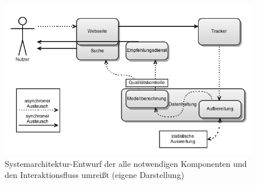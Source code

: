 \begin{itemize}
\begin{figure}[H]
  \centering
    \includegraphics[width=\textwidth]{Abbildungen/Systemmodell.png}
    \caption[Systenarchitektur]{\footnotesize Systemarchitektur-Entwurf der alle notwendigen Komponenten und den Interaktionsfluss umreißt (eigene Darstellung)}
    \label{fig:system_rough}
\end{figure}


\end{itemize}

